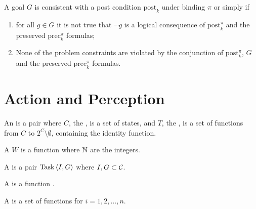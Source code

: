 \begin{defi}
A goal $G$ is consistent with a post condition $\mbox{post}_k$ under binding $\pi$ or simply  if
\begin{enumerate}
 \item for all $g\in G$ it is not true that $\neg g$ is a logical consequence of $\mbox{post}_k^{\pi}$ and the preserved $\mbox{prec}_k^{\pi}$ formulas;
 \item None of the problem constraints are violated by the conjunction of $\mbox{post}_k^{\pi}$, $G$ and the preserved $\mbox{prec}_k^{\pi}$ formulas.
\end{enumerate}
\cite{conf/ijcai/ChengI89}
\end{defi}

\section{Action and Perception}

\begin{defi}
An  is a pair  where $C$, the , is a set of states, and $T$, the , is a set of functions from $C$ to $2^C\setminus\emptyset$, containing the identity function.
\cite{conf/ijcai/BrafmanS95}
\end{defi}

\begin{defi}
A  $W$ is a function  where $\mathbb{N}$ are the integers.
\cite{conf/ijcai/BrafmanS95}
\end{defi}

\begin{defi}[Task]
A  is a pair $\mbox{Task}\left\langle I,G\right\rangle$ where $I,G\subset\mathcal{C}$.
\cite{conf/ijcai/BrafmanS95}
\end{defi}

\begin{defi}
A  is a function .
\cite{conf/ijcai/BrafmanS95}
\end{defi}

\begin{defi}
A  is a set of functions  for $i=1,2,\ldots,n$.
\cite{conf/ijcai/BrafmanS95}
\end{defi}

